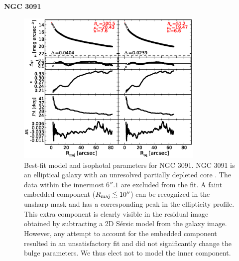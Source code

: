 \documentclass[preprint2]{emulateapj}
\newcommand{\fitfigurewidth}{0.8\textwidth}
\begin{document}
  \clearpage\newpage\noindent
  {\bf NGC 3091 \\}

  \begin{figure}[h]
  \begin{center}
  \includegraphics[width=\fitfigurewidth]{images/n3091_1Dfit.eps}
  \caption{Best-fit model and isophotal parameters for NGC 3091.
  NGC 3091 is an elliptical galaxy with an unresolved partially depleted core \citep{rusli2013}. %
  The data within the innermost $6''.1$ are excluded from the fit.
  A faint embedded component ($R_{\rm maj} \lesssim 10''$) can be recognized in the unsharp mask and has a corresponding peak in the
  ellipticity profile.
  This extra component is clearly visible in the residual image obtained by subtracting a 2D S\'ersic model from the  
  galaxy image.
  However, any attempt to account for the embedded component resulted in an unsatisfactory fit and did not 
  significantly change the bulge parameters.
  We thus elect not to model the inner component. 
  }
  \end{center}
  \end{figure}
\end{document}
